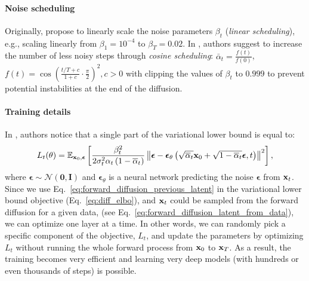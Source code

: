 \paragraph{Noise scheduling} Originally, \citet{ho2020denoising} propose to linearly scale the noise parameters $\beta_t$ (\textit{linear scheduling}), e.g., scaling linearly from $\beta_1 = 10^{-4}$ to $\beta_{T} = 0.02$. In   \citet{nichol2021improved}, authors suggest to increase the number of less noisy steps through \textit{cosine scheduling}: %
$\bar{\alpha}_{t}=\frac{f(t)}{f(0)}$, $f(t)=\cos \left(\frac{t / T+c}{1+c} \cdot \frac{\pi}{2}\right)^{2}, c > 0$
with clipping the values of $\beta_t$ to $0.999$ to prevent potential instabilities at the end of the diffusion.

\paragraph{Training details} In \citet{ho2020denoising}, authors notice that a single part of the variational lower bound is equal to:
\begin{equation}\label{eq:l_t}
    L_{t}(\theta) = \mathbb{E}_{\rvx_{0}, \boldsymbol{\epsilon}}\left[\frac{\beta_{t}^{2}}{2 \sigma_{t}^{2} \alpha_{t}\left(1-\overline{\alpha}_{t}\right)}\left\|\boldsymbol{\epsilon}-\boldsymbol{\epsilon}_{\theta}\left(\sqrt{\overline{\alpha}_{t}} \rvx_{0}+\sqrt{1-\overline{\alpha}_{t}} \boldsymbol{\epsilon}, t\right)\right\|^{2}\right] ,
\end{equation}
where $\boldsymbol{\epsilon} \sim \mathcal{N}(\mathbf{0}, \mathbf{I})$ and $\boldsymbol{\epsilon}_\theta$ is a neural network predicting the noise $\boldsymbol{\epsilon}$ from ${\mathbf{x}}_t$.
Since we use Eq.~\ref{eq:forward_diffusion_previous_latent} in the variational lower bound objective (Eq.~\ref{eq:diff_elbo}), and ${\mathbf{x}}_t$ could be sampled from the forward diffusion for a given data, (see Eq.~\ref{eq:forward_diffusion_latent_from_data}), we can optimize one layer at a time. In other words, we can randomly pick a specific component of the objective, $L_t$, and update the parameters by optimizing $L_t$ without running the whole forward process from ${\mathbf{x}}_0$ to ${\mathbf{x}}_T$. As a result, the training becomes very efficient and learning very deep models (with hundreds or even thousands of steps) is possible.

